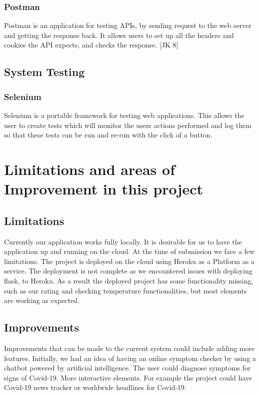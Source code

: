 \subsubsection{Postman}
Postman is an application for testing APIs, by sending request to the web server and getting the response back. It allows users to set up all the headers and cookies the API expects, and checks the response. [JK 8]

\subsection{System Testing}

\subsubsection{Selenium}
Selenium is a portable framework for testing web applications. This allows the user to create tests which will monitor the users actions performed and log them so that these tests can be run and re-run with the click of a button.

\section{Limitations and areas of Improvement in this project}

\subsection{Limitations}
Currently our application works fully locally. It is desirable for us to have the application up and running on the cloud. At the time of submission we face a few limitations. The project is deployed on the cloud using Heroku as a Platform as a service. The deployment is not complete as we encountered issues with deploying flask, to Heroku. As a result the deployed project has some functionality missing, such as our rating and checking temperature functionalities, but most elements are working as expected.  



\subsection{Improvements}
Improvements that can be made to the current system could include adding more features. Initially, we had an idea of having an online symptom checker by using a chatbot powered by artificial intelligence. The user could diagnose symptoms for signs of Covid-19.
More interactive elements. For example the project could have Covid-19 news tracker or worldwide headlines for Covid-19.



